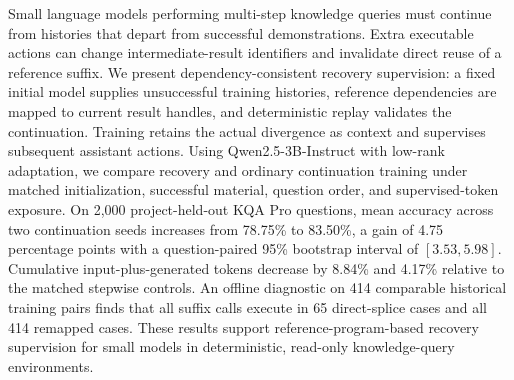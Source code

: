Small language models performing multi-step knowledge queries must continue from histories that depart from successful demonstrations. Extra executable actions can change intermediate-result identifiers and invalidate direct reuse of a reference suffix. We present dependency-consistent recovery supervision: a fixed initial model supplies unsuccessful training histories, reference dependencies are mapped to current result handles, and deterministic replay validates the continuation. Training retains the actual divergence as context and supervises subsequent assistant actions. Using Qwen2.5-3B-Instruct with low-rank adaptation, we compare recovery and ordinary continuation training under matched initialization, successful material, question order, and supervised-token exposure. On 2,000 project-held-out KQA Pro questions, mean accuracy across two continuation seeds increases from 78.75\% to 83.50\%, a gain of 4.75 percentage points with a question-paired 95\% bootstrap interval of $[3.53,5.98]$. Cumulative input-plus-generated tokens decrease by 8.84\% and 4.17\% relative to the matched stepwise controls. An offline diagnostic on 414 comparable historical training pairs finds that all suffix calls execute in 65 direct-splice cases and all 414 remapped cases. These results support reference-program-based recovery supervision for small models in deterministic, read-only knowledge-query environments.
